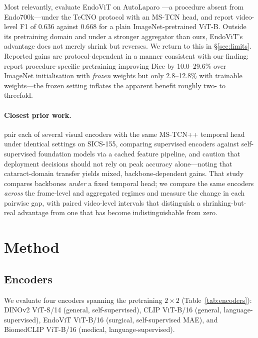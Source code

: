 \documentclass[10pt,twocolumn]{article}
\begin{document}
Most relevantly, \citet{zen2026} evaluate EndoViT on AutoLaparo
\citep{wang2022autolaparo}---a procedure absent from Endo700k---under the
TeCNO protocol with an MS-TCN head, and report video-level F1 of 0.636 against
0.668 for a plain ImageNet-pretrained ViT-B. Outside its pretraining domain and
under a stronger aggregator than ours, EndoViT's advantage does not merely
shrink but reverses. We return to this in \S\ref{sec:limits}. Reported gains are
protocol-dependent in a manner consistent with our finding:
\citet{jaspers2025surgenetxl} report procedure-specific pretraining improving
Dice by 10.0--29.6\% over ImageNet initialisation with \emph{frozen} weights but
only 2.8--12.8\% with trainable weights---the frozen setting inflates the
apparent benefit roughly two- to threefold.

\paragraph{Closest prior work.}
\citet{spencer2026msics} pair each of several visual encoders with the same
MS-TCN++ temporal head under identical settings on SICS-155, comparing
supervised encoders against self-supervised foundation models via a cached
feature pipeline, and caution that deployment decisions should not rely on peak
accuracy alone---noting that cataract-domain transfer yields mixed,
backbone-dependent gains. That study compares backbones \emph{under} a fixed
temporal head; we compare the same encoders \emph{across} the frame-level and
aggregated regimes and measure the change in each pairwise gap, with paired
video-level intervals that distinguish a shrinking-but-real advantage from one
that has become indistinguishable from zero.

\section{Method}

\subsection{Encoders}
We evaluate four encoders spanning the pretraining $2\times2$
(Table~\ref{tab:encoders}): DINOv2 ViT-S/14 \citep{oquab2024dinov2} (general,
self-supervised), CLIP ViT-B/16 \citep{radford2021clip} (general,
language-supervised), EndoViT ViT-B/16 \citep{batic2024endovit} (surgical,
self-supervised MAE), and BiomedCLIP ViT-B/16 \citep{zhang2023biomedclip}
(medical, language-supervised).
\end{document}

